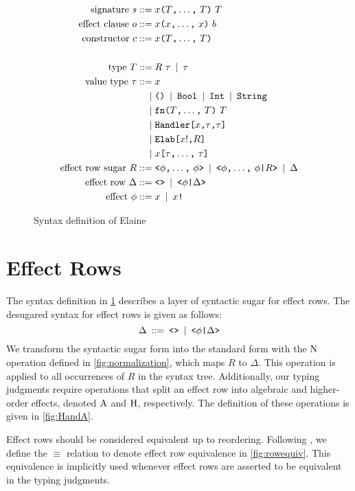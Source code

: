 \begin{figure}[p]
\begin{align*}
    \text{signature}\ s
        \mathbin{\;::=\;} & x \text{\texttt{(}} T\text{\texttt{,}} \dots \text{\texttt{,}}\ T \text{\texttt{)}}\ T\\
    \text{effect clause}\ o
        \mathbin{\;::=\;} & x \text{\texttt{(}} x\text{\texttt{,}} \dots \text{\texttt{,}}\ x \text{\texttt{)}}\ b\\
    \text{constructor}\ c
        \mathbin{\;::=\;} & x \text{\texttt{(}} T\text{\texttt{,}} \dots \text{\texttt{,}}\ T \text{\texttt{)}}\\
    \\
    \text{type}\ T
        \mathbin{\;::=\;} & R\ \tau \mathbin{\;|\;} \tau\\
    \text{value type}\ \tau
        \mathbin{\;::=\;} & x \\ 
        \mathbin{\;|\;} & \text{\texttt{()}} \mathbin{\;|\;} \text{\texttt{Bool}} \mathbin{\;|\;} \text{\texttt{Int}} \mathbin{\;|\;} \text{\texttt{String}}\\
        \mathbin{\;|\;} & \text{\texttt{fn}} \text{\texttt{(}} T\text{\texttt{,}} \dots \text{\texttt{,}}\ T \text{\texttt{)}}\ T \\
        \mathbin{\;|\;} & \text{\texttt{Handler}}\text{\texttt{[}}x\text{\texttt{,}}\tau\text{\texttt{,}}\tau\text{\texttt{]}} \\
        \mathbin{\;|\;} & \text{\texttt{Elab}}\text{\texttt{[}}x!\text{\texttt{,}}R\text{\texttt{]}} \\
        \mathbin{\;|\;} & x\text{\texttt{[}}\tau\text{\texttt{,}} \dots \text{\texttt{,}}\ \tau\text{\texttt{]}} \\
    \text{effect row sugar}\ R
        \mathbin{\;::=\;} & \text{\texttt{<}} \phi\text{\texttt{,}} \dots \text{\texttt{,}}\ \phi \text{\texttt{>}}
        \mathbin{\;|\;} \text{\texttt{<}} \phi\text{\texttt{,}} \dots \text{\texttt{,}}\ \phi \text{\texttt{|}} R \text{\texttt{>}}
        \mathbin{\;|\;} \Delta \\
    \text{effect row}\ \Delta
        \mathbin{\;::=\;} & \text{\texttt{<>}} \mathbin{\;|\;} \text{\texttt{<}}\phi\text{\texttt{|}}\Delta\text{\texttt{>}}\\
    \text{effect}\ \phi \mathbin{\;::=\;} & x \mathbin{\;|\;} x\text{\texttt{!}}
\end{align*}
\caption{Syntax definition of Elaine}
\label{fig:syntax}
\end{figure}

\section{Effect Rows}\label{sec:effectrows}

The syntax definition in \cref{fig:syntax} describes a layer of syntactic sugar for effect rows. The desugared syntax for effect rows is given as follows:
\[
\Delta \mathbin{\;::=\;} \text{\texttt{<>}} \mathbin{\;|\;} \text{\texttt{<}}\phi\text{\texttt{|}}\Delta\text{\texttt{>}}
\]
We transform the syntactic sugar form into the standard form with the $\operatorname{N}$ operation defined in \cref{fig:normalization}, which maps $R$ to $\Delta$. This operation is applied to all occurrences of $R$ in the syntax tree. Additionally, our typing judgments require operations that split an effect row into algebraic and higher-order effects, denoted $\operatorname{A}$ and $\operatorname{H}$, respectively. The definition of these operations is given in \cref{fig:HandA}.

Effect rows should be considered equivalent up to reordering. Following \textcite{leijen_koka_2014}, we define the $\equiv$ relation to denote effect row equivalence in \cref{fig:rowequiv}. This equivalence is implicitly used whenever effect rows are asserted to be equivalent in the typing judgments.

